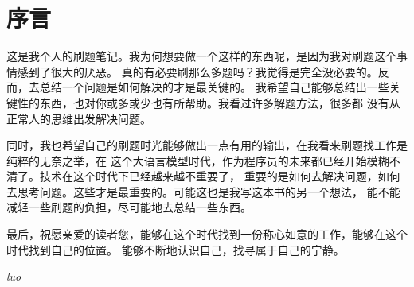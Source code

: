 \documentclass[../../main.tex]{subfiles}
\begin{document}
\chapter*{序言}

这是我个人的刷题笔记。我为何想要做一个这样的东西呢，是因为我对刷题这个事情感到了很大的厌恶。
真的有必要刷那么多题吗？我觉得是完全没必要的。反而，去总结一个问题是如何解决的才是最关键的。
我希望自己能够总结出一些关键性的东西，也对你或多或少也有所帮助。我看过许多解题方法，很多都
没有从正常人的思维出发解决问题。

同时，我也希望自己的刷题时光能够做出一点有用的输出，在我看来刷题找工作是纯粹的无奈之举，在
这个大语言模型时代，作为程序员的未来都已经开始模糊不清了。技术在这个时代下已经越来越不重要了，
重要的是如何去解决问题，如何去思考问题。这些才是最重要的。可能这也是我写这本书的另一个想法，
能不能减轻一些刷题的负担，尽可能地去总结一些东西。

最后，祝愿亲爱的读者您，能够在这个时代找到一份称心如意的工作，能够在这个时代找到自己的位置。
能够不断地认识自己，找寻属于自己的宁静。

\begin{flushright}
	\textit{luo}
\end{flushright}
\end{document}
